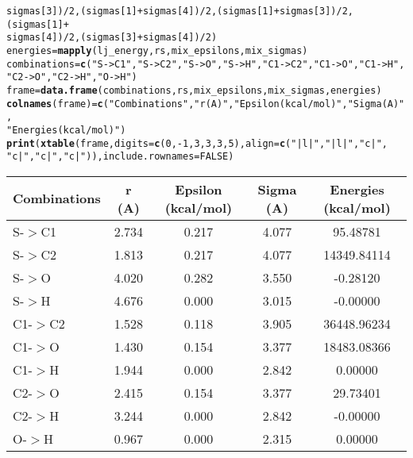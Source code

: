 \documentclass{article}\usepackage[]{graphicx}\usepackage[]{color}
\makeatletter
\newcommand{\hlnum}[1]{\textcolor[rgb]{0.686,0.059,0.569}{#1}}%
\newcommand{\hlstr}[1]{\textcolor[rgb]{0.192,0.494,0.8}{#1}}%
\newcommand{\hlopt}[1]{\textcolor[rgb]{0,0,0}{#1}}%
\newcommand{\hlstd}[1]{\textcolor[rgb]{0.345,0.345,0.345}{#1}}%
\newcommand{\hlkwb}[1]{\textcolor[rgb]{0.69,0.353,0.396}{#1}}%
\newcommand{\hlkwc}[1]{\textcolor[rgb]{0.333,0.667,0.333}{#1}}%
\newcommand{\hlkwd}[1]{\textcolor[rgb]{0.737,0.353,0.396}{\textbf{#1}}}%
\newenvironment{kframe}{%
 \def\at@end@of@kframe{}%
 \ifinner\ifhmode%
  \def\at@end@of@kframe{\end{minipage}}%
  \begin{minipage}{\columnwidth}%
 \fi\fi%
 \def\FrameCommand##1{\hskip\@totalleftmargin \hskip-\fboxsep
 \colorbox{shadecolor}{##1}\hskip-\fboxsep
     \hskip-\linewidth \hskip-\@totalleftmargin \hskip\columnwidth}%
 \MakeFramed {\advance\hsize-\width
   \@totalleftmargin\z@ \linewidth\hsize
   \@setminipage}}%
 {\par\unskip\endMakeFramed%
 \at@end@of@kframe}
\makeatother
\begin{document}
\begin{kframe}
\begin{alltt}
    \hlstd{sigmas[}\hlnum{3}\hlstd{])}\hlopt{/}\hlnum{2}\hlstd{, (sigmas[}\hlnum{1}\hlstd{]} \hlopt{+} \hlstd{sigmas[}\hlnum{4}\hlstd{])}\hlopt{/}\hlnum{2}\hlstd{, (sigmas[}\hlnum{1}\hlstd{]} \hlopt{+} \hlstd{sigmas[}\hlnum{3}\hlstd{])}\hlopt{/}\hlnum{2}\hlstd{, (sigmas[}\hlnum{1}\hlstd{]} \hlopt{+}
    \hlstd{sigmas[}\hlnum{4}\hlstd{])}\hlopt{/}\hlnum{2}\hlstd{, (sigmas[}\hlnum{3}\hlstd{]} \hlopt{+} \hlstd{sigmas[}\hlnum{4}\hlstd{])}\hlopt{/}\hlnum{2}\hlstd{)}
\hlstd{energies} \hlkwb{=} \hlkwd{mapply}\hlstd{(lj_energy, rs, mix_epsilons, mix_sigmas)}
\hlstd{combinations} \hlkwb{=} \hlkwd{c}\hlstd{(}\hlstr{"S->C1"}\hlstd{,} \hlstr{"S->C2"}\hlstd{,} \hlstr{"S->O"}\hlstd{,} \hlstr{"S->H"}\hlstd{,} \hlstr{"C1->C2"}\hlstd{,} \hlstr{"C1->O"}\hlstd{,} \hlstr{"C1->H"}\hlstd{,}
    \hlstr{"C2->O"}\hlstd{,} \hlstr{"C2->H"}\hlstd{,} \hlstr{"O->H"}\hlstd{)}
\hlstd{frame} \hlkwb{=} \hlkwd{data.frame}\hlstd{(combinations, rs, mix_epsilons, mix_sigmas, energies)}
\hlkwd{colnames}\hlstd{(frame)} \hlkwb{=} \hlkwd{c}\hlstd{(}\hlstr{"Combinations"}\hlstd{,} \hlstr{"r (A)"}\hlstd{,} \hlstr{"Epsilon (kcal/mol)"}\hlstd{,} \hlstr{"Sigma (A)"}\hlstd{,}
    \hlstr{"Energies (kcal/mol)"}\hlstd{)}
\hlkwd{print}\hlstd{(}\hlkwd{xtable}\hlstd{(frame,} \hlkwc{digits} \hlstd{=} \hlkwd{c}\hlstd{(}\hlnum{0}\hlstd{,} \hlopt{-}\hlnum{1}\hlstd{,} \hlnum{3}\hlstd{,} \hlnum{3}\hlstd{,} \hlnum{3}\hlstd{,} \hlnum{5}\hlstd{),} \hlkwc{align} \hlstd{=} \hlkwd{c}\hlstd{(}\hlstr{"|l|"}\hlstd{,} \hlstr{"|l|"}\hlstd{,} \hlstr{"c|"}\hlstd{,}
    \hlstr{"c|"}\hlstd{,} \hlstr{"c|"}\hlstd{,} \hlstr{"c|"}\hlstd{)),} \hlkwc{include.rownames} \hlstd{=} \hlnum{FALSE}\hlstd{)}
\end{alltt}
\end{kframe}%
\begin{table}[ht]
\centering
\begin{tabular}{|l|c|c|c|c|}
  \hline
Combinations & r (A) & Epsilon (kcal/mol) & Sigma (A) & Energies (kcal/mol) \\ 
  \hline
S-$>$C1 & 2.734 & 0.217 & 4.077 & 95.48781 \\ 
  S-$>$C2 & 1.813 & 0.217 & 4.077 & 14349.84114 \\ 
  S-$>$O & 4.020 & 0.282 & 3.550 & -0.28120 \\ 
  S-$>$H & 4.676 & 0.000 & 3.015 & -0.00000 \\ 
  C1-$>$C2 & 1.528 & 0.118 & 3.905 & 36448.96234 \\ 
  C1-$>$O & 1.430 & 0.154 & 3.377 & 18483.08366 \\ 
  C1-$>$H & 1.944 & 0.000 & 2.842 & 0.00000 \\ 
  C2-$>$O & 2.415 & 0.154 & 3.377 & 29.73401 \\ 
  C2-$>$H & 3.244 & 0.000 & 2.842 & -0.00000 \\ 
  O-$>$H & 0.967 & 0.000 & 2.315 & 0.00000 \\ 
   \hline
\end{tabular}
\end{table}
\end{document}
